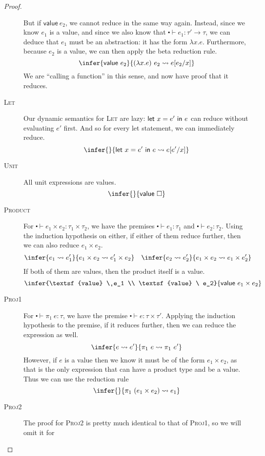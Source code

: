 \begin{proof}
\begin{description}
    But if $\textsf{value} \ e_2$, we cannot reduce in the same way
    again. Instead, since we know $e_1$ is a value, and since we also
    know that $\centerdot \vdash e_1 : \tau' \rightarrow \tau$, we can deduce that
    $e_1$ must be an abstraction: it has the form $\lambda x
    . e$. Furthermore, because $e_2$ is a value, we can then apply the
    beta reduction rule.
    \[\infer{\textsf{value} \ e_2}{(\lambda x . e) \ e_2 \leadsto e[e_2/x]}\]
    We are ``calling a function'' in this sense, and now have proof
    that it reduces.
  \item[\rm\textsc{Let}] Our dynamic semantics for \textsc{Let} are
    lazy: ${\mathsf{let} \ x = e' \ \mathsf{in} \ e}$ can reduce without evaluating $e'$
    first. And so for every let statement, we can immediately reduce.
    \[\infer{ }{\letin{x = e'}{e} \leadsto e[e'/x]}\]
  \item[\rm\textsc{Unit}] All unit expressions are values.
    \[\infer{ }{\textsf{value} \ \square}\]
  \item[\rm\textsc{Product}] For $\centerdot \vdash e_1 \times e_2 : \tau_1 \times \tau_2$, we have
    the premises $\centerdot \vdash e_1 : \tau_1$ and $\centerdot \vdash e_2 : \tau_2$. Using the
    induction hypothesis on either, if either of them reduce further,
    then we can also reduce $e_1 \times e_2$.
    \begin{align*}
      \infer{e_1 \leadsto e_1'}{e_1 \times e_2 \leadsto e_1' \times e_2} &&
      \infer{e_2 \leadsto e_2'}{e_1 \times e_2 \leadsto e_1 \times e_2'}
    \end{align*}
    If both of them are values, then the product itself is a value.
    \[\infer{\textsf{value} \ e_1 \\ \textsf{value} \ e_2}{
        \textsf{value} \ e_1 \times e_2}\]
  \item[\rm\textsc{Proj1}] For $\centerdot \vdash \pi_1 \ e : \tau$, we have the premise
    $\centerdot \vdash e : \tau \times \tau'$. Applying the induction hypothesis to the
    premise, if it reduces further, then we can reduce the expression
    as well.
    \[\infer{e \leadsto e'}{\pi_1 \ e \leadsto \pi_1 \ e'}\]
    However, if $e$ is a value then we know it must be of the form
    $e_1 \times e_2$, as that is the only expression that can have a
    product type and be a value. Thus we can use the reduction rule
    \[\infer{ }{\pi_1 \ (e_1 \times e_2) \leadsto e_1}\]
  \item[\rm\textsc{Proj2}] The proof for \textsc{Proj2} is pretty much
    identical to that of \textsc{Proj1}, so we will omit it for

\end{description}
\end{proof}
